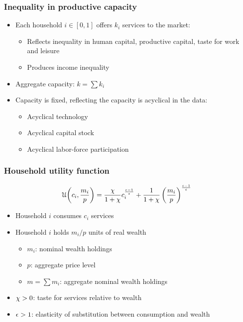 \documentclass[11pt,aspectratio=169,xcolor={dvipsnames},hyperref={pdftex,pdfpagemode=UseNone,hidelinks,pdfdisplaydoctitle=true},usepdftitle=false]{beamer}
\begin{document}
\begin{frame}
\frametitle{Inequality in productive capacity}
\begin{itemize}
\item Each household $i\in[0,1]$ offers $k_i$ services to the market:
\begin{itemize}
	\item Reflects inequality in human capital, productive capital, taste for work and leisure
	\item Produces income inequality
\end{itemize}
\item Aggregate capacity: $k = \sum k_i$
\item Capacity is fixed, reflecting the capacity is acyclical in the data:
\begin{itemize}
	\item Acyclical technology
	\item Acyclical capital stock
	\item Acyclical labor-force participation
\end{itemize}
\end{itemize}	
\end{frame}

\begin{frame}
\frametitle{Household utility function}
\vspace*{-7mm}\begin{equation*}
\mathcal{U}{\left( c_i, \frac{m_i}{p} \right)} = \frac{\chi}{1 + \chi} c_{i}^{\frac{\epsilon - 1}{\epsilon}} + \frac{1}{1 + \chi}\left( \frac{m_i}{p} \right)^{\frac{\epsilon - 1}{\epsilon}}
\end{equation*}\vspace*{-7mm}
\begin{itemize}
\item Household $i$ consumes $c_i$ services
\item Household $i$ holds $m_i/p$ units of real wealth
\begin{itemize}
	\item $m_i$: nominal wealth holdings
	\item $p$: aggregate price level
	\item $m = \sum m_i$: aggregate nominal wealth holdings
\end{itemize}
\item $\chi>0$: taste for services relative to wealth 
\item $\epsilon>1$: elasticity of substitution between consumption and wealth
\end{itemize}
\end{frame}
\end{document}
